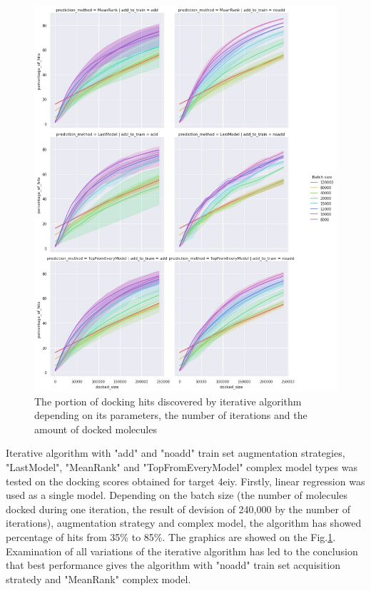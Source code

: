 \begin{figure}
    \centering
    \includegraphics[width = \linewidth]{Images/LinregIterations.jpg}
    \caption{The portion of docking hits discovered by iterative algorithm depending on its parameters, the number of iterations and the amount of docked molecules}
    \label{4eiyLinReg}
\end{figure}

Iterative algorithm with "add" and "noadd" train set augmentation strategies, "LastModel", "MeanRank" and "TopFromEveryModel" complex model types was tested on the docking scores obtained for target 4eiy.
Firstly, linear regression was used as a single model. Depending on the batch size (the number of molecules docked during one iteration, the result of devision of 240,000 by the number of iterations), augmentation strategy and complex model, the algorithm has showed percentage of hits from 35\% to 85\%. The graphics are showed on the Fig.\ref{4eiyLinReg}.
Examination of all variations of the iterative algorithm has led to the conclusion that best performance gives the algorithm with "noadd" train set acquisition stratedy and "MeanRank" complex model.\\

